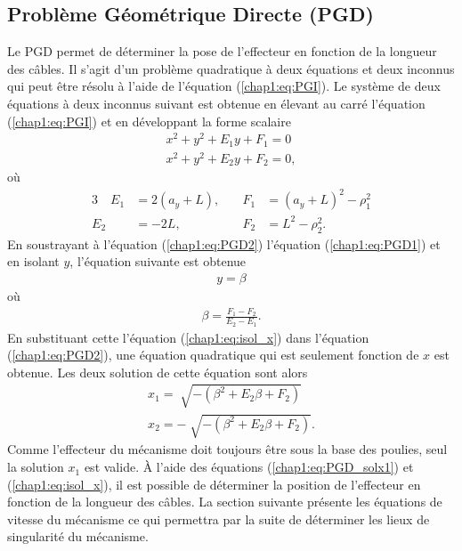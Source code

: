 \subsection{Problème Géométrique Directe (PGD)}
Le PGD permet de déterminer la pose de l'effecteur en fonction de la longueur des câbles. Il s'agit d'un problème quadratique à deux équations et deux inconnus qui peut être résolu à l'aide de l'équation (\ref{chap1:eq:PGI}). Le système de deux équations à deux inconnus suivant est obtenue en élevant au carré l'équation (\ref{chap1:eq:PGI}) et en développant la forme scalaire
\begin{align}
x^2+y^2+E_1y+F_1 = 0 \label{chap1:eq:PGD1}\\
x^2+y^2+E_2y+F_2 = 0, \label{chap1:eq:PGD2}
\end{align}
où 
\begin{alignat}{3}
\quad E_1 &= 2(a_y+L),\quad &F_1 &= (a_y+L)^2-\rho_1^2\\
E_2 &= -2L,\quad &F_2 &= L^2-\rho_2^2.
\end{alignat}
En soustrayant à l'équation (\ref{chap1:eq:PGD2}) l'équation (\ref{chap1:eq:PGD1}) et en isolant $y$, l'équation suivante est obtenue
\begin{align}
y = \beta \label{chap1:eq:isol_x}
\end{align}
où 
\begin{align}
\beta = \frac{F_1-F_2}{E_2-E_1}.
\end{align}
En substituant cette l'équation (\ref{chap1:eq:isol_x}) dans l'équation (\ref{chap1:eq:PGD2}), une équation quadratique qui est seulement fonction de $x$ est obtenue. Les deux solution de cette équation sont alors
\begin{align}
x_1 = \sqrt[]{-(\beta^2+E_2\beta+F_2)}\label{chap1:eq:PGD_solx1}\\
x_2 = -\sqrt[]{-(\beta^2+E_2\beta+F_2)}\label{chap1:eq:PGD_solx2}.
\end{align}
Comme l'effecteur du mécanisme doit toujours être sous la base des poulies, seul la solution $x_1$ est valide. 
À l'aide des équations (\ref{chap1:eq:PGD_solx1}) et (\ref{chap1:eq:isol_x}), il est possible de déterminer la position de l'effecteur en fonction de la longueur des câbles. La section suivante présente les équations de vitesse du mécanisme ce qui permettra par la suite de déterminer les lieux de singularité  du mécanisme.
